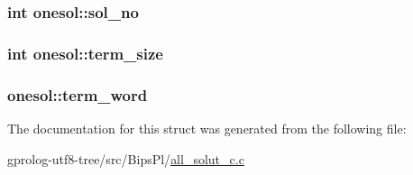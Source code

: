 \subsubsection[{\texorpdfstring{sol\+\_\+no}{sol_no}}]{\setlength{\rightskip}{0pt plus 5cm}int onesol\+::sol\+\_\+no}\hypertarget{structonesol_adf8141bfb4d67ec7ef0cdb66abc2e03d}{}\label{structonesol_adf8141bfb4d67ec7ef0cdb66abc2e03d}
\subsubsection[{\texorpdfstring{term\+\_\+size}{term_size}}]{\setlength{\rightskip}{0pt plus 5cm}int onesol\+::term\+\_\+size}\hypertarget{structonesol_a7d00bc5747882c6030eff6839217f1d5}{}\label{structonesol_a7d00bc5747882c6030eff6839217f1d5}
\subsubsection[{\texorpdfstring{term\+\_\+word}{term_word}}]{ onesol\+::term\+\_\+word}\hypertarget{structonesol_ad2da50a130c4212644b22689ded445bf}{}\label{structonesol_ad2da50a130c4212644b22689ded445bf}


The documentation for this struct was generated from the following file\+:\begin{DoxyCompactItemize}
\item 
gprolog-\/utf8-\/tree/src/\+Bips\+Pl/\hyperlink{all__solut__c_8c}{all\+\_\+solut\+\_\+c.\+c}\end{DoxyCompactItemize}
